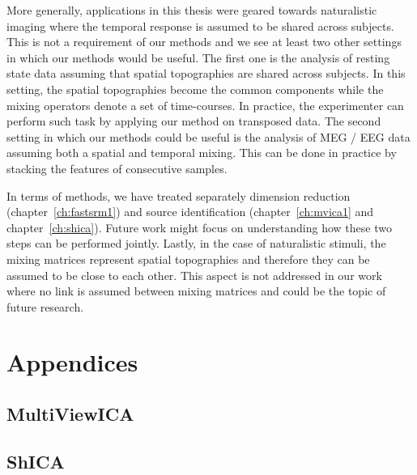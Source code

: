 \documentclass[ twoside,openright,titlepage,numbers=noenddot,%
                headinclude,footinclude,cleardoublepage=empty,abstract=on,
                BCOR=5mm,paper=a4,fontsize=11pt, 
                ]{scrreprt}
\begin{document}
More generally, applications in this thesis were geared towards naturalistic imaging where the temporal response is assumed to be shared
across subjects. This is not a requirement of our methods and we see at least two other
settings in which our methods would be useful. The first
one is the analysis of resting state data assuming that spatial topographies are
shared across subjects. In this setting, the spatial topographies become the
common components while the mixing operators denote a set of time-courses. In
practice, the experimenter can perform such task by applying our method on
transposed data.
The second setting in which our methods could be useful is the analysis of MEG / EEG data assuming both a spatial and
temporal mixing. This can be done in practice by stacking the features of
consecutive samples.

In terms of methods, we have treated separately dimension reduction
(chapter~\ref{ch:fastsrm1}) and source identification (chapter~\ref{ch:mvica1}
and chapter~\ref{ch:shica}). Future work might focus on understanding how these
two steps can be performed jointly. Lastly, in the case of naturalistic stimuli,
the mixing matrices represent spatial topographies and therefore they can be
assumed to be close to each other. This aspect is not addressed in our work
where no link is assumed between mixing matrices and could be the topic of
future research.




% 

\cleardoublepage

\appendix
\part{Appendices}
\chapter{MultiViewICA}

\chapter{ShICA}


\end{document}
